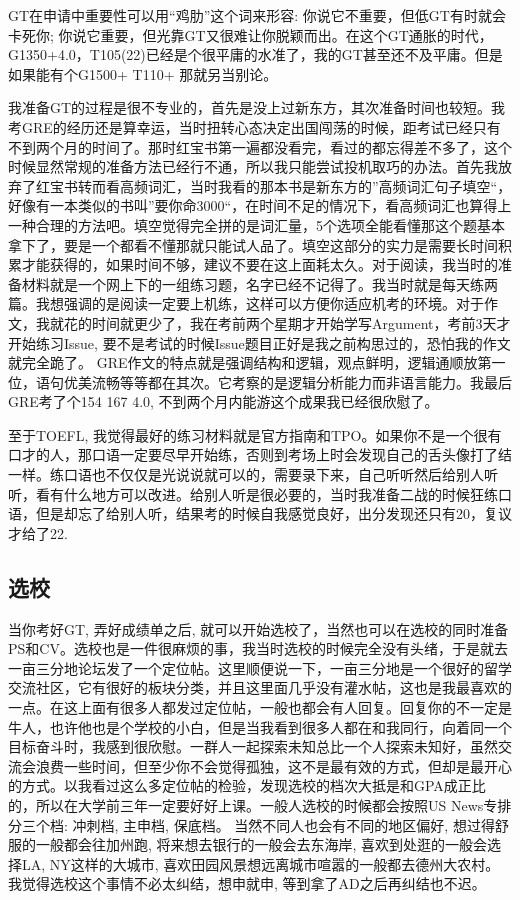  GT在申请中重要性可以用“鸡肋”这个词来形容: 你说它不重要，但低GT有时就会卡死你; 你说它重要，但光靠GT又很难让你脱颖而出。在这个GT通胀的时代，G1350+4.0，T105(22)已经是个很平庸的水准了，我的GT甚至还不及平庸。但是如果能有个G1500+ T110+ 那就另当别论。\par

我准备GT的过程是很不专业的，首先是没上过新东方，其次准备时间也较短。我考GRE的经历还是算幸运，当时扭转心态决定出国闯荡的时候，距考试已经只有不到两个月的时间了。那时红宝书第一遍都没看完，看过的都忘得差不多了，这个时候显然常规的准备方法已经行不通，所以我只能尝试投机取巧的办法。首先我放弃了红宝书转而看高频词汇，当时我看的那本书是新东方的”高频词汇句子填空“，好像有一本类似的书叫”要你命3000“，在时间不足的情况下，看高频词汇也算得上一种合理的方法吧。填空觉得完全拼的是词汇量，5个选项全能看懂那这个题基本拿下了，要是一个都看不懂那就只能试人品了。填空这部分的实力是需要长时间积累才能获得的，如果时间不够，建议不要在这上面耗太久。对于阅读，我当时的准备材料就是一个网上下的一组练习题，名字已经不记得了。我当时就是每天练两篇。我想强调的是阅读一定要上机练，这样可以方便你适应机考的环境。对于作文，我就花的时间就更少了，我在考前两个星期才开始学写Argument，考前3天才开始练习Issue, 要不是考试的时候Issue题目正好是我之前构思过的，恐怕我的作文就完全跪了。 GRE作文的特点就是强调结构和逻辑，观点鲜明，逻辑通顺放第一位，语句优美流畅等等都在其次。它考察的是逻辑分析能力而非语言能力。我最后GRE考了个154 167 4.0, 不到两个月内能游这个成果我已经很欣慰了。\par

至于TOEFL, 我觉得最好的练习材料就是官方指南和TPO。如果你不是一个很有口才的人，那口语一定要尽早开始练，否则到考场上时会发现自己的舌头像打了结一样。练口语也不仅仅是光说说就可以的，需要录下来，自己听听然后给别人听听，看有什么地方可以改进。给别人听是很必要的，当时我准备二战的时候狂练口语，但是却忘了给别人听，结果考的时候自我感觉良好，出分发现还只有20，复议才给了22.\par

\subsection{选校}

当你考好GT, 弄好成绩单之后, 就可以开始选校了，当然也可以在选校的同时准备PS和CV。选校也是一件很麻烦的事，我当时选校的时候完全没有头绪，于是就去一亩三分地论坛发了一个定位帖。这里顺便说一下，一亩三分地是一个很好的留学交流社区，它有很好的板块分类，并且这里面几乎没有灌水帖，这也是我最喜欢的一点。在这上面有很多人都发过定位帖，一般也都会有人回复。回复你的不一定是牛人，也许他也是个学校的小白，但是当我看到很多人都在和我同行，向着同一个目标奋斗时，我感到很欣慰。一群人一起探索未知总比一个人探索未知好，虽然交流会浪费一些时间，但至少你不会觉得孤独，这不是最有效的方式，但却是最开心的方式。以我看过这么多定位帖的检验，发现选校的档次大抵是和GPA成正比的，所以在大学前三年一定要好好上课。一般人选校的时候都会按照US News专排分三个档: 冲刺档, 主申档, 保底档。 当然不同人也会有不同的地区偏好, 想过得舒服的一般都会往加州跑, 将来想去银行的一般会去东海岸, 喜欢到处逛的一般会选择LA, NY这样的大城市, 喜欢田园风景想远离城市喧嚣的一般都去德州大农村。 我觉得选校这个事情不必太纠结，想申就申, 等到拿了AD之后再纠结也不迟。 

